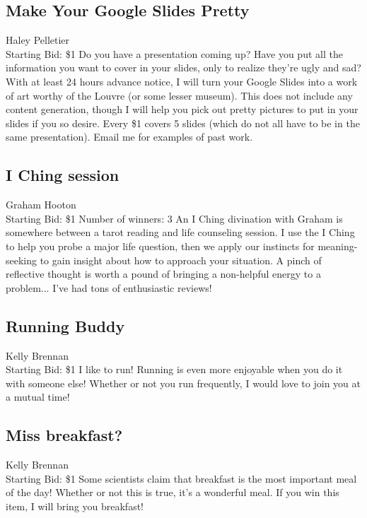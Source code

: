 \documentclass[11pt]{article}
\begin{document}
\subsection{Make Your Google Slides Pretty}
Haley Pelletier
\\
Starting Bid: \$1
\newline
Do you have a presentation coming up? Have you put all the information you want to cover in your slides, only to realize they're ugly and sad? With at least 24 hours advance notice, I will turn your Google Slides into a work of art worthy of the Louvre (or some lesser museum). This does not include any content generation, though I will help you pick out pretty pictures to put in your slides if you so desire. Every \$1 covers 5 slides (which do not all have to be in the same presentation). Email me for examples of past work.
\subsection{I Ching session}
Graham Hooton
\\
Starting Bid: \$1
\newline
Number of winners: 3
\newline
An I Ching divination with Graham is somewhere between a tarot reading and life counseling session. I use the I Ching to help you probe a major life question, then we apply our instincts for meaning-seeking to gain insight about how to approach your situation. 
A pinch of reflective thought is worth a pound of bringing a non-helpful energy to a problem... I've had tons of enthusiastic reviews!
\subsection{Running Buddy}
Kelly Brennan
\\
Starting Bid: \$1
\newline
I like to run! Running is even more enjoyable when you do it with someone else! Whether or not you run frequently, I would love to join you at a mutual time!
\subsection{Miss breakfast?}
Kelly Brennan
\\
Starting Bid: \$1
\newline
Some scientists claim that breakfast is the most important meal of the day! Whether or not this is true, it's a wonderful meal. If you win this item, I will bring you breakfast!
\end{document}
